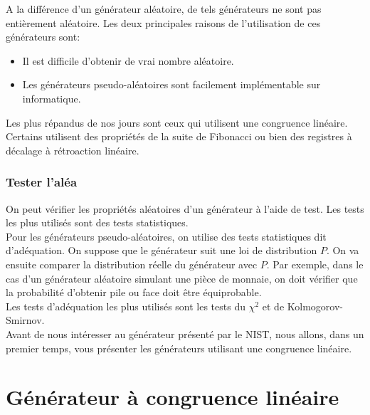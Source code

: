 \documentclass[a4paper,11pt]{report}
\begin{document}
		A la diff\'erence d'un g\'en\'erateur al\'eatoire, de tels g\'en\'erateurs ne sont pas enti\`erement %
		al\'eatoire. Les deux principales raisons de l'utilisation de ces g\'en\'erateurs sont:\\
		\begin{itemize}
		\item Il est difficile d'obtenir de vrai nombre al\'eatoire.
		\item Les g\'en\'erateurs pseudo-al\'eatoires sont facilement impl\'ementable sur informatique.\\
		\end{itemize}			
		
		Les plus r\'epandus de nos jours sont ceux qui utilisent une congruence lin\'eaire. %
		Certains utilisent des propri\'et\'es de la suite de Fibonacci ou bien des registres %
		\`a d\'ecalage \`a r\'etroaction lin\'eaire.\\
		
	\subsection{Tester l'al\'ea}	
	
	On peut v\'erifier les propri\'et\'es al\'eatoires d'un g\'en\'erateur \`a l'aide de test. Les tests les plus %
	utilis\'es sont des tests statistiques.   \\
	
	
	Pour les g\'en\'erateurs pseudo-al\'eatoires, on utilise des tests statistiques dit d'ad\'equation. %
	On suppose que le g\'en\'erateur suit une loi de distribution $P$. On va ensuite comparer la %
	distribution r\'eelle du g\'en\'erateur avec $P$. Par exemple, dans le cas d'un g\'en\'erateur al\'eatoire %
	simulant une pi\`ece de monnaie, on doit v\'erifier que la probabilit\'e d'obtenir pile ou face doit %
	\^etre \'equiprobable. \\
	Les tests d'ad\'equation les plus utilis\'es sont les tests du $\chi^2$ et de Kolmogorov-Smirnov. \\
	
	
	
	
	Avant de nous int\'eresser au g\'en\'erateur pr\'esent\'e par le NIST, nous allons, dans un premier temps, vous pr\'esenter les g\'en\'erateurs utilisant une congruence lin\'eaire.\\ 
	
		
	\chapter{G\'en\'erateur \`a congruence lin\'eaire}
\end{document}
